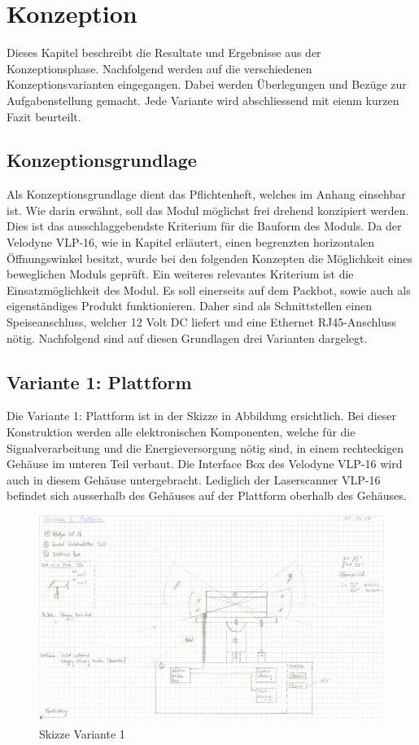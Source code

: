 \chapter{Konzeption}
\label{chap:Konzeption}

Dieses Kapitel beschreibt die Resultate und Ergebnisse aus der Konzeptionsphase. Nachfolgend werden auf die verschiedenen Konzeptionsvarianten eingegangen. Dabei werden Überlegungen und Bezüge zur Aufgabenstellung gemacht. Jede Variante wird abschliessend mit eienm kurzen Fazit beurteilt.

\section{Konzeptionsgrundlage}
\label{sec:Konzeptiongrund}
Als Konzeptionsgrundlage dient das Pflichtenheft, welches im Anhang  einsehbar ist. Wie darin erwähnt, soll das Modul möglichst frei drehend konzipiert werden. Dies ist das ausschlaggebendste Kriterium für die Bauform des Moduls. Da der Velodyne VLP-16, wie in Kapitel  erläutert, einen begrenzten horizontalen Öffnungswinkel besitzt, wurde bei den folgenden Konzepten die Möglichkeit eines beweglichen Moduls geprüft. Ein weiteres relevantes Kriterium ist die Einsatzmöglichkeit des Modul. Es soll einerseits auf dem Packbot, sowie auch als eigenständiges Produkt funktionieren. Daher sind als Schnittstellen einen Speiseanschluss, welcher 12 Volt DC liefert und eine Ethernet RJ45-Anschluss nötig. Nachfolgend sind auf diesen Grundlagen drei Varianten dargelegt.


\section {Variante 1: Plattform}
\label{sec:var1}
Die Variante 1: Plattform ist in der Skizze in Abbildung  ersichtlich. Bei dieser Konstruktion werden alle elektronischen Komponenten, welche für die Signalverarbeitung und die Energieversorgung nötig sind, in einem rechteckigen Gehäuse im unteren Teil verbaut. Die Interface Box des Velodyne VLP-16 wird auch in diesem Gehäuse untergebracht. Lediglich der Laserscanner VLP-16 befindet sich ausserhalb des Gehäuses auf der Plattform oberhalb des Gehäuses.

\begin{figure}[H]
	\centering
	\includegraphics[width=1\textwidth]{resources/skizzev1.PNG}
	\caption{Skizze Variante 1}
\label{fig:skizze_unrotierend}
\end{figure} 
	
